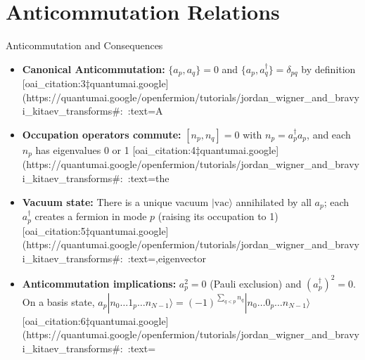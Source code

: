 \documentclass{beamer}
\begin{document}
\section{Anticommutation Relations}
\begin{frame}{Anticommutation and Consequences}
\begin{itemize}
  \item \textbf{Canonical Anticommutation:} $\{a_p,a_q\}=0$ and $\{a_p,a_q^\dagger\}=\delta_{pq}$ by definition [oai_citation:3‡quantumai.google](https://quantumai.google/openfermion/tutorials/jordan_wigner_and_bravyi_kitaev_transforms#:~:text=A%
  \item \textbf{Occupation operators commute:} $[n_p,n_q]=0$ with $n_p=a_p^\dagger a_p$, and each $n_p$ has eigenvalues 0 or 1 [oai_citation:4‡quantumai.google](https://quantumai.google/openfermion/tutorials/jordan_wigner_and_bravyi_kitaev_transforms#:~:text=the%
  \item \textbf{Vacuum state:} There is a unique vacuum $|\text{vac}\rangle$ annihilated by all $a_p$; each $a_p^\dagger$ creates a fermion in mode $p$ (raising its occupation to 1) [oai_citation:5‡quantumai.google](https://quantumai.google/openfermion/tutorials/jordan_wigner_and_bravyi_kitaev_transforms#:~:text=,eigenvector%
  \item \textbf{Anticommutation implications:} $a_p^2=0$ (Pauli exclusion) and $(a_p^\dagger)^2=0$.  On a basis state, 
  $a_p|n_0\ldots 1_p \ldots n_{N-1}\rangle = (-1)^{\sum_{q<p}n_q}|n_0\ldots 0_p\ldots n_{N-1}\rangle$ [oai_citation:6‡quantumai.google](https://quantumai.google/openfermion/tutorials/jordan_wigner_and_bravyi_kitaev_transforms#:~:text=%
\end{itemize}
\end{frame}
\end{document}
